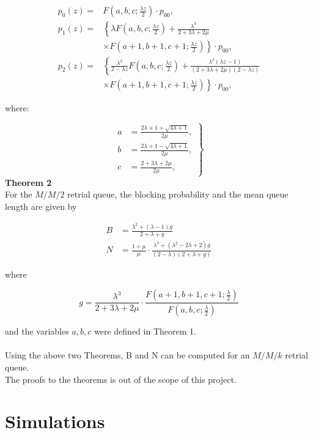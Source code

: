 \documentclass[10pt]{article}
\begin{document}
\begin{align*}
p_{0}(z)= & F\left(a, b, c ; \frac{\lambda z}{2}\right) \cdot p_{00}, \\
p_{1}(z)= & \left\{\lambda F\left(a, b, c ; \frac{\lambda z}{2}\right)+\frac{\lambda^{3}}{2+3 \lambda+2 \mu}\right. \\
& \left.\times F\left(a+1, b+1, c+1 ; \frac{\lambda z}{2}\right)\right\} \cdot p_{00}, \\
p_{2}(z)= & \left\{\frac{\lambda^{2}}{2-\lambda z} F\left(a, b, c ; \frac{\lambda z}{2}\right)+\frac{\lambda^{3}(\lambda z-1)}{(2+3 \lambda+2 \mu)(2-\lambda z)}\right. \\
& \left.\times F\left(a+1, b+1, c+1 ; \frac{\lambda z}{2}\right)\right\} \cdot p_{00}, 
\end{align*}


where:

\[
\left.\begin{array}{rl}
a & =\frac{2 \lambda+1+\sqrt{4 \lambda+1}}{2 \mu}, \\
b & =\frac{2 \lambda+1-\sqrt{4 \lambda+1}}{2 \mu},  \\
c & =\frac{2+3 \lambda+2 \mu}{2 \mu},
\end{array}\right\}
\]
\textbf{Theorem 2}\\ For the $M / M / 2$ retrial queue, the blocking probability and the mean queue length are given by


\begin{align*}
B & =\frac{\lambda^{2}+(\lambda-1) g}{2+\lambda+g}  \\
N & =\frac{1+\mu}{\mu} \cdot \frac{\lambda^{3}+\left(\lambda^{2}-2 \lambda+2\right) g}{(2-\lambda)(2+\lambda+g)}
\end{align*}


where

$$
g=\frac{\lambda^{3}}{2+3 \lambda+2 \mu} \cdot \frac{F\left(a+1, b+1, c+1 ; \frac{\lambda}{2}\right)}{F\left(a, b, c ; \frac{\lambda}{2}\right)}
$$

and the variables $a, b, c$ were defined in Theorem 1.
\\
\\
Using the above two Theorems, B and N can be computed for an $M/M/k$ retrial queue.\\
The proofs to the theorems is out of the scope of this project.
\section{Simulations}
\end{document}
